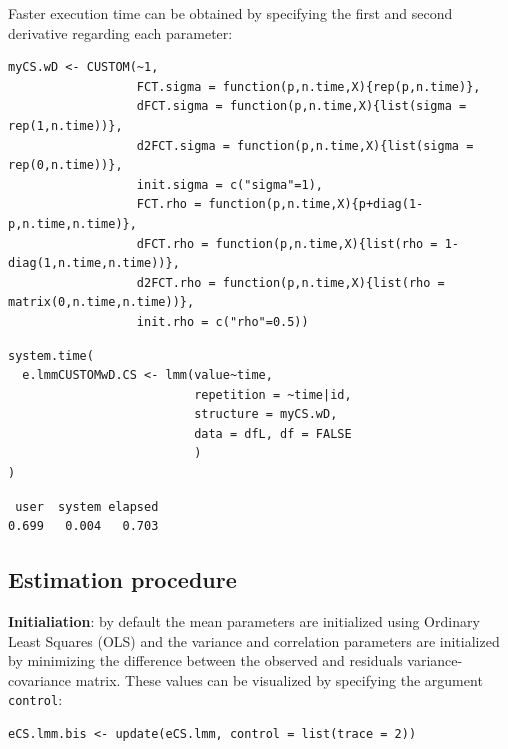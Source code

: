 \documentclass[12pt]{article}
\begin{document}
Faster execution time can be obtained by specifying the first and
second derivative regarding each parameter:
\lstset{language=r,label= ,caption= ,captionpos=b,numbers=none}
\begin{lstlisting}
myCS.wD <- CUSTOM(~1,
                  FCT.sigma = function(p,n.time,X){rep(p,n.time)},
                  dFCT.sigma = function(p,n.time,X){list(sigma = rep(1,n.time))},
                  d2FCT.sigma = function(p,n.time,X){list(sigma = rep(0,n.time))},
                  init.sigma = c("sigma"=1),
                  FCT.rho = function(p,n.time,X){p+diag(1-p,n.time,n.time)},
                  dFCT.rho = function(p,n.time,X){list(rho = 1-diag(1,n.time,n.time))},
                  d2FCT.rho = function(p,n.time,X){list(rho = matrix(0,n.time,n.time))},
                  init.rho = c("rho"=0.5))
\end{lstlisting}

\lstset{language=r,label= ,caption= ,captionpos=b,numbers=none}
\begin{lstlisting}
system.time(
  e.lmmCUSTOMwD.CS <- lmm(value~time,
                          repetition = ~time|id,
                          structure = myCS.wD, 
                          data = dfL, df = FALSE
                          )
)
\end{lstlisting}

\begin{verbatim}
 user  system elapsed 
0.699   0.004   0.703
\end{verbatim}



\clearpage

\subsection{Estimation procedure}
\label{sec:org4846baa}

\textbf{Initialiation}: by default the mean parameters are initialized using
 Ordinary Least Squares (OLS) and the variance and correlation
 parameters are initialized by minimizing the difference between the
 observed and residuals variance-covariance matrix. These values can
 be visualized by specifying the argument \texttt{control}:
\lstset{language=r,label= ,caption= ,captionpos=b,numbers=none}
\begin{lstlisting}
eCS.lmm.bis <- update(eCS.lmm, control = list(trace = 2))
\end{lstlisting}
\end{document}

